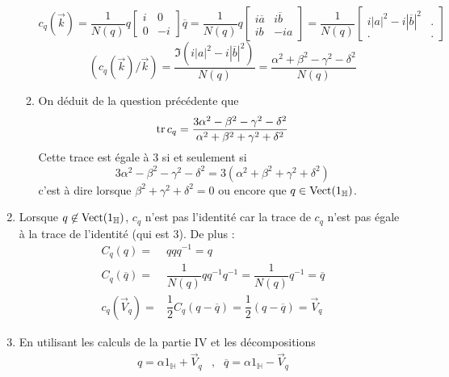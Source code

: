\begin{enumerate}
\begin{enumerate}
\begin{displaymath}
c_q(\overrightarrow k) = \dfrac{1}{N(q)} q 
\begin{bmatrix}
 i & 0 \\
 0 & -i
\end{bmatrix}
\overline{q}
= \dfrac{1}{N(q)} q 
\begin{bmatrix}
 i\overline{a} & i\overline{b} \\
 ib & -ia
\end{bmatrix} 
= \dfrac{1}{N(q)} 
\begin{bmatrix}
 i|a|^2 -i|\overline{b}|^2 & . \\
 . & .
\end{bmatrix}
\end{displaymath}
\begin{displaymath}
 (c_q(\overrightarrow k)/\overrightarrow k)
= \dfrac{\Im(i|a|^2 -i|\overline{b}|^2)}{N(q)}
= \dfrac{\alpha^2 +\beta^2 -\gamma^2 -\delta^2}{N(q)}
\end{displaymath}
\item On déduit de la question précédente que
\begin{displaymath}
 \operatorname{tr} c_q = \dfrac{3\alpha^2 -\beta^2 -\gamma^2 -\delta^2}{\alpha^2 +\beta^2 +\gamma^2 +\delta^2}
\end{displaymath}
Cette trace est égale à 3 si et seulement si
\begin{displaymath}
 3\alpha^2 -\beta^2 -\gamma^2 -\delta^2 = 3(\alpha^2 +\beta^2 +\gamma^2 +\delta^2)
\end{displaymath}
c'est à dire lorsque $\beta^2 +\gamma^2 +\delta^2=0$ ou encore que $q\in \operatorname{Vect} (1_{\mathbb H})$.
\end{enumerate}
\item Lorsque $q\not\in \operatorname{Vect} (1_{\mathbb H})$, $c_q$ n'est pas l'identité car la trace de $c_q$ n'est pas égale à la trace de l'identité (qui est 3). De plus :
\begin{align*}
 C_q(q) =& q q q^{-1} =q\\
C_q(\overline{q}) =& \dfrac{1}{N(q)}qq^{-1}q^{-1}  = \dfrac{1}{N(q)}q^{-1} = \overline{q}\\
c_q(\overrightarrow V_q) =& \dfrac{1}{2}C_q(q-\overline{q})= \dfrac{1}{2}(q-\overline{q})= \overrightarrow V_q
\end{align*}
\item En utilisant les calculs de la partie IV et les décompositions
\begin{align*}
 q = \alpha 1_{\mathbb H} + \overrightarrow V_q
&,&
 \overline{q} = \alpha 1_{\mathbb H} - \overrightarrow V_q

\end{align*}
\end{enumerate}
